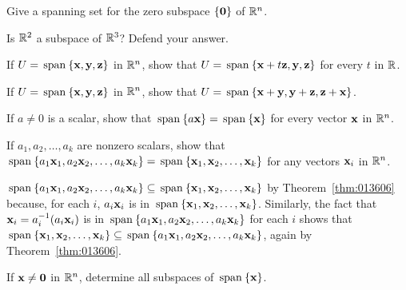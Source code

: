 \begin{multicols}{2}
\begin{ex}
Give a spanning set for the zero subspace $\{\textbf{0}\}$ of $\mathbb{R}^n$.
\end{ex}

\begin{ex}
Is $\mathbb{R}^2$ a subspace of $\mathbb{R}^3$? Defend your answer.
\end{ex}

\begin{ex}
If $U = \thinspace\operatorname{span\medspace}\{\textbf{x}, \textbf{y}, \textbf{z}\}$ in $\mathbb{R}^n$, show that $U = \thinspace\operatorname{span\medspace}\{\textbf{x} + t\textbf{z}, \textbf{y}, \textbf{z}\}$ for every $t$ in $\mathbb{R}$.
\end{ex}

\begin{ex}
If $U = \thinspace\operatorname{span\medspace}\{\textbf{x}, \textbf{y}, \textbf{z}\}$ in $\mathbb{R}^n$, show that $U = \thinspace\operatorname{span\medspace}\{\textbf{x} + \textbf{y}, \textbf{y} + \textbf{z}, \textbf{z} + \textbf{x}\}$.
\end{ex}

\begin{ex}
If $a \neq 0$ is a scalar, show that $\thinspace\operatorname{span\medspace}\{a\textbf{x}\} = \thinspace\operatorname{span\medspace}\{\textbf{x}\}$ for every vector $\textbf{x}$ in $\mathbb{R}^n$.
\end{ex}

\begin{ex}
If $a_{1}, a_{2}, \dots, a_{k}$ are nonzero scalars, show that $\thinspace\operatorname{span\medspace}\{a_{1}\textbf{x}_{1}, a_{2}\textbf{x}_{2}, \dots, a_{k}\textbf{x}_{k}\} = \thinspace\operatorname{span\medspace}\{\textbf{x}_{1}, \textbf{x}_{2}, \dots, \textbf{x}_{k}\}$ for any vectors $\textbf{x}_{i}$ in $\mathbb{R}^n$.

\begin{sol}
$\thinspace\operatorname{span\medspace}\{a_{1}\textbf{x}_{1}, a_{2}\textbf{x}_{2}, \dots, a_{k}\textbf{x}_{k}\} \subseteq \thinspace\operatorname{span\medspace}\{\textbf{x}_{1}, \textbf{x}_{2}, \dots, \textbf{x}_{k}\}$ by Theorem~\ref{thm:013606} because, for each $i$, $a_{i}\textbf{x}_{i}$ is in $\thinspace\operatorname{span\medspace}\{\textbf{x}_{1}, \textbf{x}_{2}, \dots, \textbf{x}_{k}\}$. Similarly, the fact that $\textbf{x}_{i} = a_{i}^{-1}(a_{i}\textbf{x}_{i})$ is in $\thinspace\operatorname{span\medspace}\{a_{1}\textbf{x}_{1}, a_{2}\textbf{x}_{2}, \dots, a_{k}\textbf{x}_{k}\}$ for each $i$ shows that $\thinspace\operatorname{span\medspace}\{\textbf{x}_{1}, \textbf{x}_{2}, \dots, \textbf{x}_{k}\} \subseteq \thinspace\operatorname{span\medspace}\{a_{1}\textbf{x}_{1}, a_{2}\textbf{x}_{2}, \dots, a_{k}\textbf{x}_{k}\}$, again by Theorem~\ref{thm:013606}.
\end{sol}
\end{ex}

\begin{ex}
If $\textbf{x} \neq \textbf{0}$ in $\mathbb{R}^n$, determine all subspaces of $\thinspace\operatorname{span\medspace}\{\textbf{x}\}$.
\end{ex}


\end{multicols}
